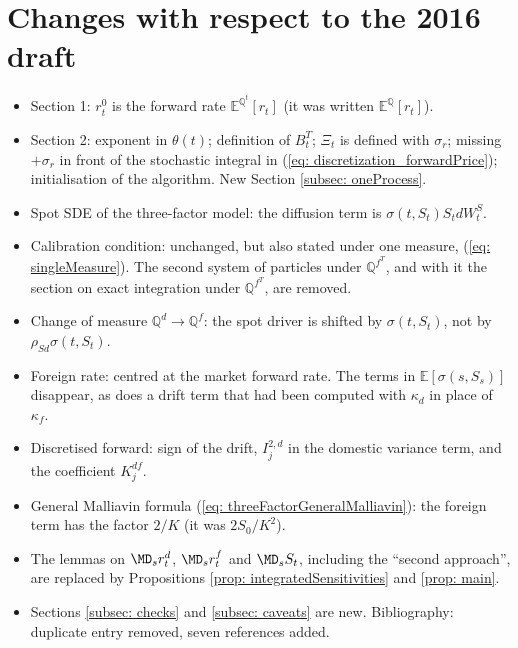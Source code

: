\section{Changes with respect to the 2016 draft}
\begin{itemize}
\item Section 1: $r^0_t$ is the forward rate $\mathbb{E}^{\mathbb{Q}^t}[r_t]$ (it was written $\mathbb{E}^{\mathbb{Q}}[r_t]$).
\item Section 2: exponent in $\theta(t)$; definition of $B^T_t$; $\Xi_t$ is defined with $\sigma_r$; missing $+\sigma_r$ in front of the stochastic integral in (\ref{eq: discretization_forwardPrice}); initialisation of the algorithm. New Section \ref{subsec: oneProcess}.
\item Spot SDE of the three-factor model: the diffusion term is $\sigma(t,S_t)S_tdW^S_t$.
\item Calibration condition: unchanged, but also stated under one measure, (\ref{eq: singleMeasure}). The second system of particles under $\mathbb{Q}^{f^T}$, and with it the section on exact integration under $\mathbb{Q}^{f^T}$, are removed.
\item Change of measure $\mathbb{Q}^d\to\mathbb{Q}^f$: the spot driver is shifted by $\sigma(t,S_t)$, not by $\rho_{Sd}\sigma(t,S_t)$.
\item Foreign rate: centred at the market forward rate. The terms in $\mathbb{E}[\sigma(s,S_s)]$ disappear, as does a drift term that had been computed with $\kappa_d$ in place of $\kappa_f$.
\item Discretised forward: sign of the drift, $I^{2,d}_j$ in the domestic variance term, and the coefficient $K^{df}_j$.
\item General Malliavin formula (\ref{eq: threeFactorGeneralMalliavin}): the foreign term has the factor $2/K$ (it was $2S_0/K^2$).
\item The lemmas on $\MD_sr^d_t$, $\MD_sr^f_t$ and $\MD_sS_t$, including the ``second approach'', are replaced by Propositions \ref{prop: integratedSensitivities} and \ref{prop: main}.
\item Sections \ref{subsec: checks} and \ref{subsec: caveats} are new. Bibliography: duplicate entry removed, seven references added.
\end{itemize}

